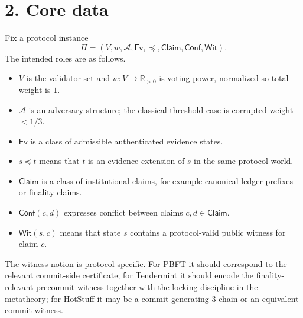\documentclass[11pt]{article}
\newcommand{\Wit}{\mathsf{Wit}}
\newcommand{\Conf}{\mathsf{Conf}}
\newcommand{\Claim}{\mathsf{Claim}}
\newcommand{\Ev}{\mathsf{Ev}}
\begin{document}
\section*{2. Core data}
Fix a protocol instance
\[
\Pi = (V,w,\mathcal{A},\Ev,\preceq,\Claim,\Conf,\Wit).
\]
The intended roles are as follows.
\begin{itemize}
    \item $V$ is the validator set and $w:V\to \mathbb{R}_{>0}$ is voting power, normalized so total weight is $1$.
    \item $\mathcal{A}$ is an adversary structure; the classical threshold case is corrupted weight $<1/3$.
    \item $\Ev$ is a class of admissible authenticated evidence states.
    \item $s\preceq t$ means that $t$ is an evidence extension of $s$ in the same protocol world.
    \item $\Claim$ is a class of institutional claims, for example canonical ledger prefixes or finality claims.
    \item $\Conf(c,d)$ expresses conflict between claims $c,d\in \Claim$.
    \item $\Wit(s,c)$ means that state $s$ contains a protocol-valid public witness for claim $c$.
\end{itemize}
The witness notion is protocol-specific. For PBFT it should correspond to the relevant commit-side certificate; for Tendermint it should encode the finality-relevant precommit witness together with the locking discipline in the metatheory; for HotStuff it may be a commit-generating $3$-chain or an equivalent commit witness.
\end{document}

